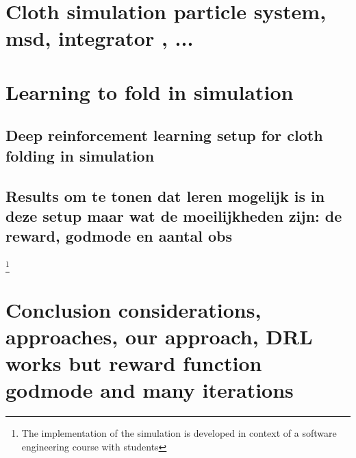 \documentclass[\home/main.tex]{subfiles}
\begin{document}

\section{Cloth simulation \tiny{particle system, msd, integrator , ...} }




\section{Learning to fold in simulation}
\subsection{Deep reinforcement learning setup for cloth folding in simulation}
\subsection{Results \tiny{om te tonen dat leren mogelijk is in deze setup maar wat de moeilijkheden zijn: de reward, godmode en aantal obs}}

\footnote{The implementation of the simulation is developed in context of a software engineering course with students }


\section{Conclusion {\tiny considerations, approaches, our approach, DRL works but reward function godmode and many iterations}}
\end{document}
